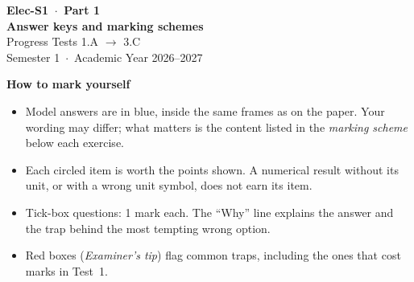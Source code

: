 \documentclass{ibetest}
\begin{document}
\testheader
\vspace{14mm}
\begin{center}
  {\sffamily\bfseries\Huge Elec-S1 \,$\cdot$\, Part 1}\\[6pt]
  {\sffamily\bfseries\LARGE Answer keys and marking schemes}\\[8pt]
  {\large Progress Tests 1.A $\to$ 3.C}\\[3pt]
  {\normalsize Semester 1 \,$\cdot$\, Academic Year 2026--2027}
\end{center}
\vspace{9mm}

{\sffamily\bfseries How to mark yourself}
\begin{itemize}[leftmargin=7mm, itemsep=3pt]
  \item Model answers are in \textcolor{keyblue}{blue}, inside the same frames as on the
        paper. Your wording may differ; what matters is the content listed in the
        \emph{marking scheme} below each exercise.
  \item Each circled item is worth the points shown. A numerical result without its unit,
        or with a wrong unit symbol, does not earn its item.
  \item Tick-box questions: 1 mark each. The ``Why'' line explains the answer and the trap
        behind the most tempting wrong option.
  \item Red boxes (\emph{Examiner's tip}) flag common traps, including the ones that cost
        marks in Test~1.
\end{itemize}
\end{document}
